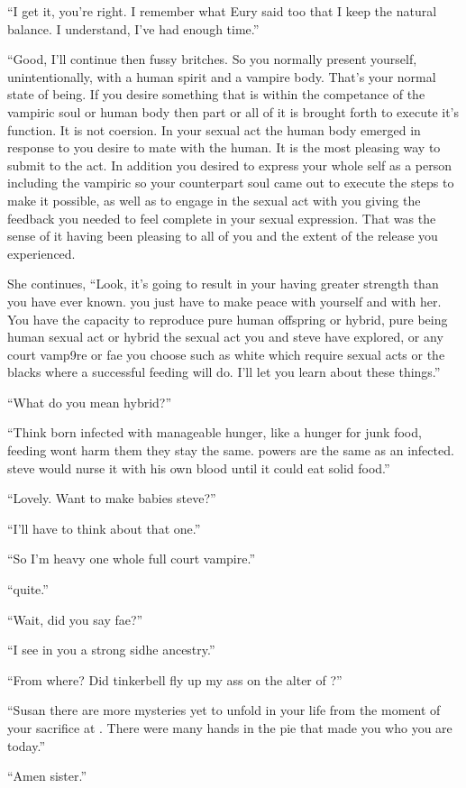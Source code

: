 ``I get it, you're right. I remember what Eury said too that I keep the natural balance. I understand, I've had enough time.''

``Good, I'll continue then fussy britches. So you normally present yourself, unintentionally, with a human spirit and a vampire body. That's your normal state of being. If you desire something that is within the competance of the vampiric soul or human body then part or all of it is brought forth to execute it's function. It is not coersion. In your sexual act the human body emerged in response to you desire to mate with the human. It is the most pleasing way to submit to the act. In addition you desired to express your whole self as a person including the vampiric so your counterpart soul came out to execute the steps to make it possible, as well as to engage in the sexual act with you giving the feedback you needed to feel complete in your sexual expression. That was the sense of it having been pleasing to all of you and the extent of the release you experienced.

She continues, ``Look, it's going to result in your having greater strength than you have ever known. you just have to make peace with yourself and with her. You have the capacity to reproduce pure human offspring or hybrid, pure being human sexual act or hybrid the sexual act you and steve have explored, or any court vamp9re or fae you choose such as white which require sexual acts or the blacks where a successful feeding will do. I'll let you learn about these things.''

``What do you mean hybrid?''

``Think born infected with manageable hunger, like a hunger for junk food, feeding wont harm them they stay the same. powers are the same as an infected. steve would nurse it with his own blood until it could eat solid food.''

``Lovely. Want to make babies steve?''

``I'll have to think about that one.''

``So I'm heavy one whole full court vampire.''

``quite.''

``Wait, did you say fae?''

``I see in you a strong sidhe ancestry.''

``From where? Did tinkerbell fly up my ass on the alter of \chichenitza?''

``Susan there are more mysteries yet to unfold in your life from the moment of your sacrifice at \chichenitza. There were many hands in the pie that made you who you are today.''

``Amen sister.''


















